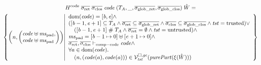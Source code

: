 \documentclass[a4paper]{article}
\begin{document}
\begin{multline*}
  H^\mathrm{code} \; \sigrets \; \sigcloss \; \code \; (\ta,\_,\gsigrets,\gsigcloss) \; \hat{W} =\\
  \left\{\npair{\arraycolsep=0pt\left(\array{l}\code \uplus \mspad,\\ \code \uplus \mspad\endarray\right)} \middle|
    \begin{array}{l}
    \dom(\code) = [\baddr,\eaddr] \wedge \\
      ([\baddr - 1, \eaddr + 1] \subseteq \ta \wedge \sigrets \subseteq \gsigrets \wedge \sigcloss \subseteq \gsigcloss \wedge \trust = \trusted) \vee \\
      \quad ([\baddr-1,\eaddr+1]\mathrel{\#} \ta \wedge \sigrets = \emptyset \wedge \trust =\untrusted) \wedge \\
      \mspad = [\baddr-1 \mapsto 0] \uplus [\eaddr + 1 \mapsto 0]\wedge\\
      \sigrets,\sigcloss \vdash_{\mathrm{comp-code}} \code \wedge\\
      \forall a \in \dom(\code)\ldotp\\
      \quad\npair{(\code(a),\code(a))} \in \lrvg{\trust}(\purePart{\xi(\hat{W})})
    \end{array}
  \right\}
\end{multline*}
\end{document}
